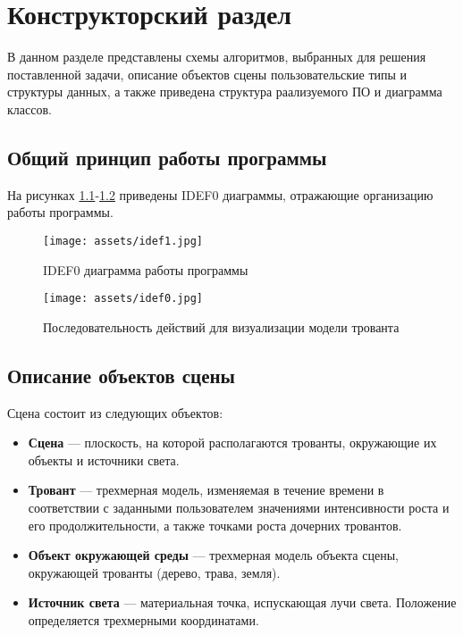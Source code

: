 \chapter{Конструкторский раздел}
В данном разделе представлены схемы алгоритмов, выбранных для решения поставленной задачи, описание объектов сцены пользовательские типы и структуры данных, а также приведена структура раализуемого ПО и диаграмма классов.

\section{Общий принцип работы программы}
На рисунках \ref{idef_0}-\ref{idef_1} приведены IDEF0 диаграммы, отражающие организацию работы программы.

\begin{figure}[h!]
	\begin{center}
		\texttt{[image: assets/idef1.jpg]}
	\end{center}
	\caption{IDEF0 диаграмма работы программы}
	\label{idef_0}
\end{figure}

\newpage

\begin{figure}[h!]
	\begin{center}
		\texttt{[image: assets/idef0.jpg]}
	\end{center}
	\caption{Последовательность действий для визуализации модели трованта}
	\label{idef_1}
\end{figure}

\section{Описание объектов сцены}
Сцена состоит из следующих объектов:
\begin{itemize}
    \item \textbf{Сцена} --- плоскость, на которой располагаются трованты, окружающие их объекты и источники света.
    \item \textbf{Тровант} --- трехмерная модель, изменяемая в течение времени в соответствии с заданными пользователем значениями интенсивности роста и его продолжительности, а также точками роста дочерних тровантов. 
    \item \textbf{Объект окружающей среды} --- трехмерная модель объекта сцены, окружающей трованты (дерево, трава, земля).
	\item \textbf{Источник света} --- материальная точка, испускающая лучи света. Положение определяется трехмерными координатами.
\end{itemize}

